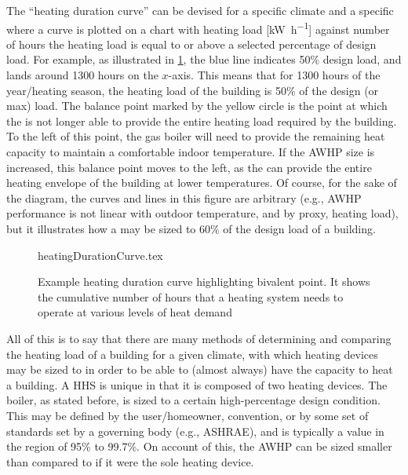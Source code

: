 The ``heating duration curve'' can be devised for a specific climate and a specific \HP where a curve is plotted on a chart with heating load [\unit{\kilo\watt\per\hour}] against number of hours the heating load is equal to or above a selected percentage of design load. For example, as illustrated in \cref{fig:heatingloaddurationcurve}, the blue line indicates 50\% design load, and lands around 1300 hours on the $x$-axis. This means that for 1300 hours of the year/heating season, the heating load of the building is 50\% of the design (or max) load. The balance point marked by the yellow circle is the point at which the \HP is not longer able to provide the entire heating load required by the building. To the left of this point, the gas boiler will need to provide the remaining heat capacity to maintain a comfortable indoor temperature. If the \ac{AWHP} size is increased, this balance point moves to the left, as the \HP can provide the entire heating envelope of the building at lower temperatures. Of course, for the sake of the diagram, the curves and lines in this figure are arbitrary (e.g., \ac{AWHP} performance is not linear with outdoor temperature, and by proxy, heating load), but it illustrates how a \HP may be sized to 60\% of the design load of a building.

\begin{figure}[htb]
    \centering
    {heatingDurationCurve.tex}
    \caption{Example heating duration curve highlighting bivalent point. It shows the cumulative number of hours that a heating system needs to operate at various levels of heat demand}
    \label{fig:heatingloaddurationcurve}
\end{figure}

All of this is to say that there are many methods of determining and comparing the heating load of a building for a given climate, with which heating devices may be sized to in order to be able to (almost always) have the capacity to heat a building. A \ac{HHS} is unique in that it is composed of two heating devices. The boiler, as stated before, is sized to a certain high-percentage design condition. This may be defined by the user/homeowner, convention, or by some set of standards set by a governing body (e.g., ASHRAE), and is typically a value in the region of 95\% to 99.7\%. On account of this, the \ac{AWHP} can be sized smaller than compared to if it were the sole heating device.

